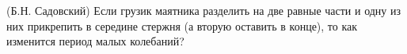(Б.Н. Садовский)
Если грузик маятника разделить на две равные части и одну из них
прикрепить в середине стержня (а вторую оставить в конце), то как
изменится период малых колебаний?
